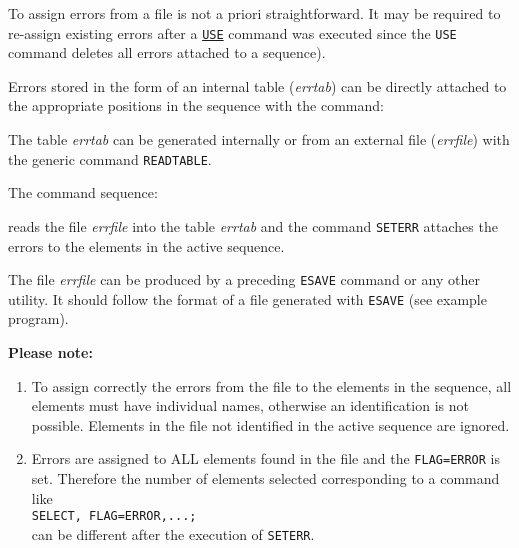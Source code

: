 To assign errors from a file is not a priori straightforward. It may be
required to re-assign existing errors after a \hyperref[sec:use]{\texttt{USE}}
command was executed since the \texttt{USE} command deletes all errors attached to 
a sequence).

Errors stored in the form of an internal table (\textit{errtab}) can  be
directly attached to the appropriate positions in the sequence with the
command:  


The table \textit{errtab} can be generated internally or from an
external file (\textit{errfile}) with the generic command \texttt{READTABLE}.
 

The command sequence: 

reads the file \textit{errfile} into the table \textit{errtab} and the
command \texttt{SETERR} attaches the errors to the elements in the active
sequence.  

The file \textit{errfile} can be produced by a preceding \texttt{ESAVE} command
or any other utility. It should follow the format of a file generated
with \texttt{ESAVE} (see example program). 

\textbf{Please note:}
\begin{enumerate}
   \item To assign correctly the errors from the file to the elements in
     the sequence, all elements must have individual names, otherwise an
     identification is not possible. Elements in the file not identified
     in the active sequence are ignored.  
   \item Errors are assigned to ALL elements found in the file and the
     \texttt{FLAG=ERROR} is set. Therefore the number of elements selected
     corresponding to a command like
     \\ \texttt{SELECT, FLAG=ERROR,...;}
     \\ can be different after the execution of \texttt{SETERR}. 
\end{enumerate}


